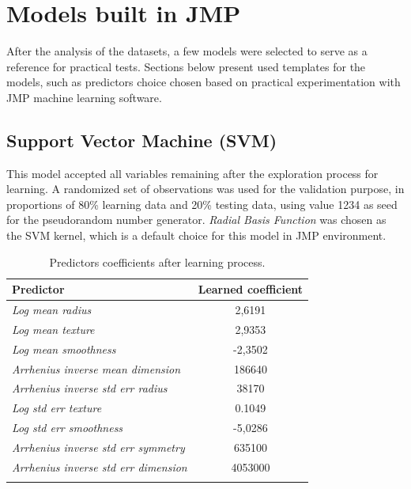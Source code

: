 \section{Models built in JMP}

After the analysis of the datasets, a few models were selected to serve as a reference for practical tests. Sections below present used templates for the models, such as predictors choice chosen based on practical experimentation with JMP machine learning software.

\subsection{Support Vector Machine (SVM)}

This model accepted all variables remaining after the exploration process for learning. A randomized set of observations was used for the validation purpose, in proportions of 80\% learning data and 20\% testing data, using value 1234 as seed for the pseudorandom number generator. \textit{Radial Basis Function} was chosen as the SVM kernel, which is a default choice for this model in JMP environment.

\begin{longtable}{l | c}
	\centering
	Predictor & Learned coefficient \\
	\hline
	\textit{Log mean radius} & 2,6191 \\
	\textit{Log mean texture} & 2,9353 \\
	\textit{Log mean smoothness} & -2,3502 \\
	\textit{Arrhenius inverse mean dimension} & 186640 \\
	\textit{Arrhenius inverse std err radius} & 38170 \\
	\textit{Log std err texture} & 0.1049 \\
	\textit{Log std err smoothness} & -5,0286 \\
	\textit{Arrhenius inverse std err symmetry} & 635100 \\
	\textit{Arrhenius inverse std err dimension} & 4053000 \\
	\caption{Predictors coefficients after learning process.}
	\label{svm:1}
\end{longtable} 

